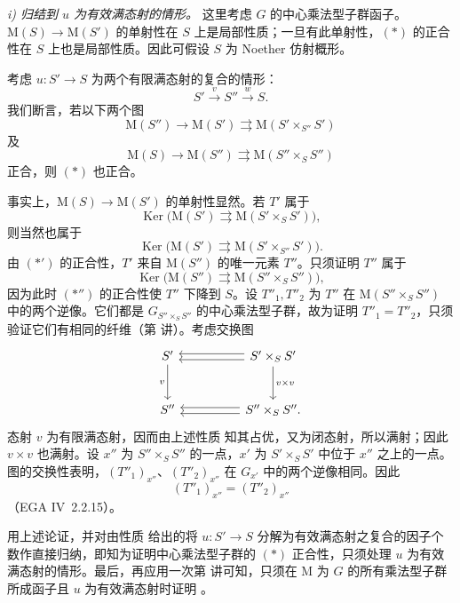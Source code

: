 \textit{i) 归结到 \(u\) 为有效满态射的情形。}\quad
这里考虑 \(G\) 的中心乘法型子群函子。\(\mathrm M(S)\to\mathrm M(S')\) 的单射性在 \(S\) 上是局部性质；一旦有此单射性，\((*)\) 的正合性在 \(S\) 上也是局部性质。因此可假设 \(S\) 为 Noether 仿射概形。

考虑 \(u:S'\to S\) 为两个有限满态射的复合的情形：
\[
  S'\xrightarrow{v}S''\xrightarrow{w}S.
\]
我们断言，若以下两个图
\[
  \tag{*'}\label{sga3:xv:lemma:3-7:equation:star-prime}
  \mathrm M(S'')\longrightarrow\mathrm M(S')
  \rightrightarrows\mathrm M(S'\times_{S''}S')
\]
及
\[
  \tag{*''}\label{sga3:xv:lemma:3-7:equation:star-prime-prime}
  \mathrm M(S)\longrightarrow\mathrm M(S'')
  \rightrightarrows\mathrm M(S''\times_S S'')
\]
正合，则 \((*)\) 也正合。

事实上，\(\mathrm M(S)\to\mathrm M(S')\) 的单射性显然。若 \(T'\) 属于
\[
  \operatorname{Ker}\bigl(
    \mathrm M(S')\rightrightarrows
    \mathrm M(S'\times_S S')\bigr),
\]
则当然也属于
\[
  \operatorname{Ker}\bigl(
    \mathrm M(S')\rightrightarrows
    \mathrm M(S'\times_{S''}S')\bigr).
\]
由 \((*')\) 的正合性，\(T'\) 来自 \(\mathrm M(S'')\) 的唯一元素 \(T''\)。只须证明 \(T''\) 属于
\[
  \operatorname{Ker}\bigl(
    \mathrm M(S'')\rightrightarrows
    \mathrm M(S''\times_S S'')\bigr),
\]
因为此时 \((*'')\) 的正合性使 \(T''\) 下降到 \(S\)。设 \(T''_1,T''_2\) 为 \(T''\) 在 \(\mathrm M(S''\times_S S'')\) 中的两个逆像。它们都是 \(G_{S''\times_S S''}\) 的中心乘法型子群，故为证明 \(T''_1=T''_2\)，只须验证它们有相同的纤维（第  讲）。考虑交换图
\[
\begin{tikzcd}[column sep=huge,row sep=large]
S' \arrow[d,"v"'] &
  S'\times_S S' \arrow[l,shift left=.55ex]
    \arrow[l,shift right=.55ex] \arrow[d,"v\times v"]\\
S'' &
  S''\times_S S'' . \arrow[l,shift left=.55ex]
    \arrow[l,shift right=.55ex]
\end{tikzcd}
\]
态射 \(v\) 为有限满态射，因而由上述性质 \textup{} 知其占优，又为闭态射，所以满射；因此 \(v\times v\) 也满射。设 \(x''\) 为 \(S''\times_S S''\) 的一点，\(x'\) 为 \(S'\times_S S'\) 中位于 \(x''\) 之上的一点。图的交换性表明，\((T''_1)_{x''}\)、\((T''_2)_{x''}\) 在 \(G_{x'}\) 中的两个逆像相同。因此
\[
  (T''_1)_{x''}=(T''_2)_{x''}
\]
（EGA IV~2.2.15）。

用上述论证，并对由性质 \textup{} 给出的将 \(u:S'\to S\) 分解为有效满态射之复合的因子个数作直接归纳，即知为证明中心乘法型子群的 \((*)\) 正合性，只须处理 \(u\) 为有效满态射的情形。最后，再应用一次第  讲可知，只须在 \(\mathrm M\) 为 \(G\) 的所有乘法型子群所成函子且 \(u\) 为有效满态射时证明 。

